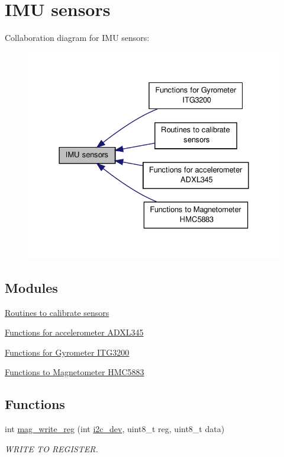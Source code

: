 \hypertarget{group__imu}{\section{I\-M\-U sensors}
\label{group__imu}
}
Collaboration diagram for I\-M\-U sensors\-:
\nopagebreak
\begin{figure}[H]
\begin{center}
\leavevmode
\includegraphics[width=328pt]{group__imu}
\end{center}
\end{figure}
\subsection*{Modules}
\begin{DoxyCompactItemize}
\item 
\hyperlink{group__calibrate}{Routines to calibrate sensors}
\item 
\hyperlink{group__acc}{Functions for accelerometer A\-D\-X\-L345}
\item 
\hyperlink{group__gyr}{Functions for Gyrometer I\-T\-G3200}
\item 
\hyperlink{group__mag}{Functions to Magnetometer H\-M\-C5883}
\end{DoxyCompactItemize}
\subsection*{Functions}
\begin{DoxyCompactItemize}
\item 
int \hyperlink{group__imu_gab5d0ae421cd4bb10b1b7a1eda167416b}{mag\-\_\-write\-\_\-reg} (int \hyperlink{CommunicationV0_2communication_8c_a7751bd45ac1064efb35adf1f19c25db8}{i2c\-\_\-dev}, uint8\-\_\-t reg, uint8\-\_\-t data)
\begin{DoxyCompactList}\small\item\em W\-R\-I\-T\-E T\-O R\-E\-G\-I\-S\-T\-E\-R. \end{DoxyCompactList}\end{DoxyCompactItemize}


